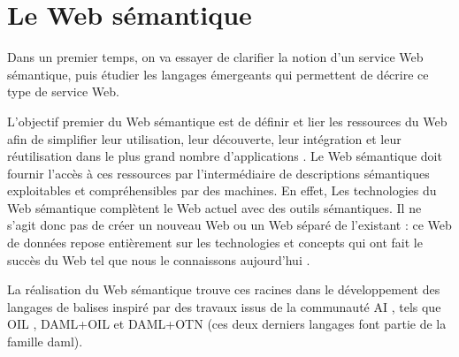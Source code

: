\chapter{Le Web sémantique}
\label{annexe:semantic-web}





Dans un premier temps, on va essayer de clarifier la notion d'un
service Web sémantique, puis étudier les langages émergeants qui
permettent de décrire ce type de service Web.

L'objectif premier du Web sémantique est de définir et lier les
ressources du Web afin de simplifier leur utilisation, leur
découverte, leur intégration et leur réutilisation dans le plus grand
nombre d'applications \cite{berners2001semantic}. Le Web sémantique
doit fournir l'accès à ces ressources par l'intermédiaire de
descriptions sémantiques exploitables et compréhensibles par des
machines. En effet, Les technologies du Web sémantique complètent le
Web actuel avec des outils sémantiques. Il ne s'agit donc pas de créer
un nouveau Web ou un Web séparé de l'existant : ce Web de données
repose entièrement sur les technologies et concepts qui ont fait le
succès du Web tel que nous le connaissons aujourd'hui
\cite{bertails2010web}.

La réalisation du Web sémantique trouve ces racines dans le
développement des langages de balises inspiré par des travaux issus
de la communauté AI \cite{mcilraith2001semantic}, tels que \textsc{OIL}
\cite{fensel2001oil}, \textsc{DAML+OIL} \cite{horrocks2002daml+oil} et
\textsc{DAML+OTN} \cite{mcguinness2003daml} (ces deux derniers
langages font partie de la famille \acrshort{daml}).

